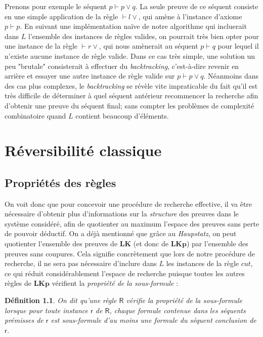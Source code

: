 \documentclass[11pt]{report}
\newcommand{\seq}{\vdash}
\newcommand{\irule}[1]{\footnotesize$#1$}
\newcommand{\iruleR}[1]{\irule{\seq{#1}}}
\newtheorem{definition}{Définition}
\begin{document}
Prenons pour exemple le séquent $p \seq p \lor q$. La seule preuve de ce séquent consiste en une simple application de la règle {\iruleR{l\lor}}, qui amène à l'instance d'axiome $p \seq p$. En suivant une implémentation naïve de notre algorithme qui incluerait dans $L$ l'ensemble des instances de règles valides, on pourrait très bien opter pour une instance de la règle {\iruleR{r\lor}}, qui nous amènerait au séquent $p \seq q$ pour lequel il n'existe aucune instance de règle valide. Dans ce cas très simple, une solution un peu "brutale" consisterait à effectuer du \emph{backtracking}, c'est-à-dire revenir en arrière et essayer une autre instance de règle valide sur $p \seq p \lor q$. Néanmoins dans des cas plus complexes, le \emph{backtracking} se révèle vite impraticable du fait qu'il est très difficile de déterminer à quel séquent antérieur recommencer la recherche afin d'obtenir une preuve du séquent final; sans compter les problèmes de complexité combinatoire quand $L$ contient beaucoup d'éléments.

\chapter{Réversibilité classique}

\section{Propriétés des règles}

On voit donc que pour concevoir une procédure de recherche effective, il va être nécessaire d'obtenir plus d'informations sur la \emph{structure} des preuves dans le système considéré, afin de quotienter au maximum l'espace des preuves sans perte de pouvoir déductif. On a déjà mentionné que grâce au \emph{Haupstatz}, on peut quotienter l'ensemble des preuves de $\mathbf{LK}$ (et donc de $\mathbf{LKp}$) par l'ensemble des preuves sans coupures. Cela signifie concrètement que lors de notre procédure de recherche, il ne sera pas nécessaire d'inclure dans $L$ les instances de la règle $cut$, ce qui réduit considérablement l'espace de recherche puisque toutes les autres règles de $\mathbf{LKp}$ vérifient la \emph{propriété de la sous-formule} :

\begin{definition}
    On dit qu'une règle $\mathsf{R}$ vérifie la \emph{propriété de la sous-formule} lorsque pour toute instance $\mathsf{r}$ de $\mathsf{R}$, chaque formule contenue dans les séquents prémisses de $\mathsf{r}$ est sous-formule d'au moins une formule du séquent conclusion de $\mathsf{r}$.
\end{definition}
\end{document}
